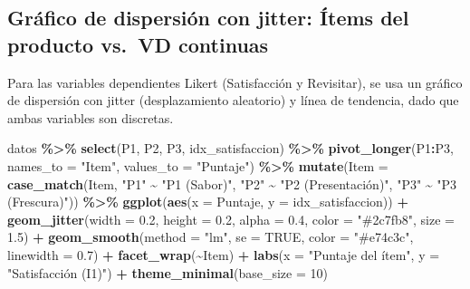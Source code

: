 \documentclass[
  spanish,
]{article}
\newenvironment{Shaded}{\begin{snugshade}}{\end{snugshade}}
\newcommand{\AttributeTok}[1]{\textcolor[rgb]{0.13,0.29,0.53}{#1}}
\newcommand{\ConstantTok}[1]{\textcolor[rgb]{0.56,0.35,0.01}{#1}}
\newcommand{\DecValTok}[1]{\textcolor[rgb]{0.00,0.00,0.81}{#1}}
\newcommand{\FloatTok}[1]{\textcolor[rgb]{0.00,0.00,0.81}{#1}}
\newcommand{\FunctionTok}[1]{\textcolor[rgb]{0.13,0.29,0.53}{\textbf{#1}}}
\newcommand{\NormalTok}[1]{#1}
\newcommand{\SpecialCharTok}[1]{\textcolor[rgb]{0.81,0.36,0.00}{\textbf{#1}}}
\newcommand{\StringTok}[1]{\textcolor[rgb]{0.31,0.60,0.02}{#1}}
\begin{document}
\subsection{Gráfico de dispersión con jitter: Ítems del producto vs.~VD
continuas}\label{gruxe1fico-de-dispersiuxf3n-con-jitter-uxedtems-del-producto-vs.-vd-continuas}

Para las variables dependientes Likert (Satisfacción y Revisitar), se
usa un gráfico de dispersión con jitter (desplazamiento aleatorio) y
línea de tendencia, dado que ambas variables son discretas.

\begin{Shaded}
\begin{Highlighting}[]
\NormalTok{datos }\SpecialCharTok{\%\textgreater{}\%}
  \FunctionTok{select}\NormalTok{(P1, P2, P3, idx\_satisfaccion) }\SpecialCharTok{\%\textgreater{}\%}
  \FunctionTok{pivot\_longer}\NormalTok{(P1}\SpecialCharTok{:}\NormalTok{P3, }\AttributeTok{names\_to =} \StringTok{"Item"}\NormalTok{, }\AttributeTok{values\_to =} \StringTok{"Puntaje"}\NormalTok{) }\SpecialCharTok{\%\textgreater{}\%}
  \FunctionTok{mutate}\NormalTok{(}\AttributeTok{Item =} \FunctionTok{case\_match}\NormalTok{(Item,}
                            \StringTok{"P1"} \SpecialCharTok{\textasciitilde{}} \StringTok{"P1 (Sabor)"}\NormalTok{,}
                            \StringTok{"P2"} \SpecialCharTok{\textasciitilde{}} \StringTok{"P2 (Presentación)"}\NormalTok{,}
                            \StringTok{"P3"} \SpecialCharTok{\textasciitilde{}} \StringTok{"P3 (Frescura)"}\NormalTok{)) }\SpecialCharTok{\%\textgreater{}\%}
  \FunctionTok{ggplot}\NormalTok{(}\FunctionTok{aes}\NormalTok{(}\AttributeTok{x =}\NormalTok{ Puntaje, }\AttributeTok{y =}\NormalTok{ idx\_satisfaccion)) }\SpecialCharTok{+}
  \FunctionTok{geom\_jitter}\NormalTok{(}\AttributeTok{width =} \FloatTok{0.2}\NormalTok{, }\AttributeTok{height =} \FloatTok{0.2}\NormalTok{, }\AttributeTok{alpha =} \FloatTok{0.4}\NormalTok{, }\AttributeTok{color =} \StringTok{"\#2c7fb8"}\NormalTok{, }\AttributeTok{size =} \FloatTok{1.5}\NormalTok{) }\SpecialCharTok{+}
  \FunctionTok{geom\_smooth}\NormalTok{(}\AttributeTok{method =} \StringTok{"lm"}\NormalTok{, }\AttributeTok{se =} \ConstantTok{TRUE}\NormalTok{, }\AttributeTok{color =} \StringTok{"\#e74c3c"}\NormalTok{, }\AttributeTok{linewidth =} \FloatTok{0.7}\NormalTok{) }\SpecialCharTok{+}
  \FunctionTok{facet\_wrap}\NormalTok{(}\SpecialCharTok{\textasciitilde{}}\NormalTok{Item) }\SpecialCharTok{+}
  \FunctionTok{labs}\NormalTok{(}\AttributeTok{x =} \StringTok{"Puntaje del ítem"}\NormalTok{, }\AttributeTok{y =} \StringTok{"Satisfacción (I1)"}\NormalTok{) }\SpecialCharTok{+}
  \FunctionTok{theme\_minimal}\NormalTok{(}\AttributeTok{base\_size =} \DecValTok{10}\NormalTok{)}
\end{Highlighting}
\end{Shaded}
\end{document}
